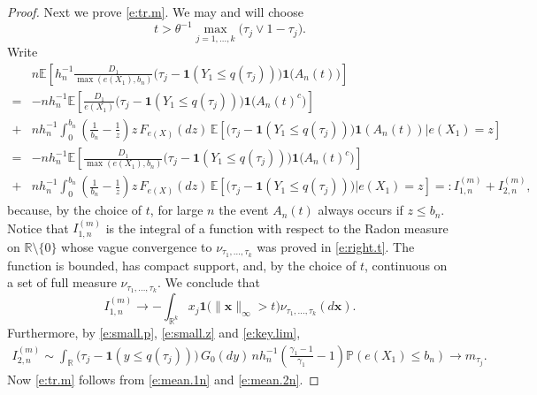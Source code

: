 \documentclass[12pt]{amsart}
\newcommand{\bbr}{\mathbb{R}}
\newcommand{\LFe}{F_{e(X)}}
\newcommand{\1}{\mathbbm{1}}
\newcommand{\0}{\mathbf{0}}
\newcommand{\one}{\mathbf{1}}
\newcommand{\E}{\mathbb{E}}
\theoremstyle{plain}
\theoremstyle{definition}
\newcommand{\bbP}{\mathbb{P}}
\newcommand{\bx}{\mathbf{x}}
\begin{document}
\begin{proof}
Next we prove \eqref{e:tr.m}. We may and will choose 
$$
t>\theta^{-1} \max_{j=1,\ldots, k}\bigl(\tau_j\vee 1-\tau_j \bigr). 
$$
Write
\begin{align*} 
& n\E\left[ h_n^{-1}\frac{D_1}{\max(e(X_1),b_n)}
  \bigl( \tau_j-\one(Y_1\leq q(\tau_j))\bigr) \one\bigl( A_n(t)\bigr)\right] \\
=&- nh_n^{-1}\E\left[ \frac{D_1}{e(X_1)}\bigl( \tau_j-\one(Y_1\leq
   q(\tau_j))\bigr) \one\bigl( A_n(t)^c\bigr)\right]  \\
  +&  nh_n^{-1} \int_0^{b_n} \left( \frac{1}{b_n}-\frac{1}{z}\right)
     z\, \LFe(dz) \, \E\left[ \bigl( \tau_j-\one(Y_1\leq q(\tau_j))\bigr)
           \one(A_n(t))     \Big|    e(X_1)=z\right]\\
=&-nh_n^{-1}\E\left[ \frac{D_1}{\max(e(X_1),b_n)}\bigl( \tau_j-\one(Y_1\leq
   q(\tau_j))\bigr) \one\bigl( A_n(t)^c\bigr)\right]   \\
   +& nh_n^{-1} \int_0^{b_n} \left( \frac{1}{b_n}-\frac{1}{z}\right)
     z\, \LFe(dz) \, \E\left[ \bigl( \tau_j-\one(Y_1\leq q(\tau_j))\bigr)
               \Big|    e(X_1)=z\right]
=: I_{1,n}^{(m)}+  I_{2,n}^{(m)},
\end{align*}
because, by the choice of $t$, for large $n$ the event $A_n(t)$ always occurs if $z\leq b_n$. 
Notice that $ I_{1,n}^{(m)}$ is the integral of a function with
respect to the Radon measure on $\bbr\setminus \{0\}$ whose vague
convergence to $\nu_{\tau_1,\ldots,\tau_k}$ was proved in \eqref{e:right.t}. The
function is bounded, has compact support, and, by the choice of $t$, 
continuous on a set of full measure $\nu_{\tau_1,\ldots,\tau_k}$. We conclude that
\begin{equation} \label{e:mean.1n}
  I_{1,n}^{(m)} \to - \int_{\bbr^k} x_j\one\bigl( \|\bx\|_\infty>t\bigr)
\nu_{\tau_1,\ldots, \tau_k}(d\bx).
\end{equation}
Furthermore, by \eqref{e:small.p}, \eqref{e:small.z} and
\eqref{e:key.lim},
\begin{align} \label{e:mean.2n}
I_{2,n}^{(m)} \sim \int_\bbr 
  \bigl( \tau_j-\one(y\leq q(\tau_j)))\, G_0(dy)\, 
  nh_n^{-1} \left( \frac{\gamma_1-1}{\gamma_1}-1\right) \bbP(e(X_1)\leq
  b_n) \to m_{\tau_j}. 
\end{align}
Now \eqref{e:tr.m} follows from \eqref{e:mean.1n} and
\eqref{e:mean.2n}.


\end{proof}
\end{document}
